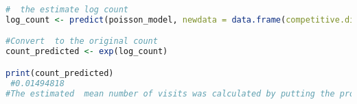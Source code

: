 \documentclass[12pt,letterpaper]{article}
\begin{document}
\begin{enumerate}
 \begin{lstlisting}[language=R] 
#  the estimate log count 
log_count <- predict(poisson_model, newdata = data.frame(competitive.district=1, marginality.06=0, PAN.governor.06=1), type = "link")

#Convert  to the original count 
count_predicted <- exp(log_count)

print(count_predicted)
 #0.01494818
#The estimated  mean number of visits was calculated by putting the provided values into the regression equation and then using the exponential function to convert the log count for the number of visits in a Poisson regression model back to number of visit
\end{lstlisting} 
	
\end{enumerate}
\end{document}
